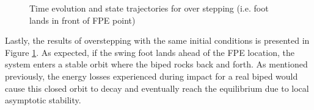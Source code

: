 \begin{figure}[!h]
	\begin{center}
	\end{center}
  	\caption{Time evolution and state trajectories for over stepping (i.e. foot lands in front of FPE point)}
	\label{sim:over}
\end{figure}

Lastly, the results of overstepping with the same initial conditions is presented in Figure \ref{sim:over}. As expected, if the swing foot lands ahead of the FPE location, the system enters a stable orbit where the biped rocks back and forth. As mentioned previously, the energy losses experienced during impact for a real biped would cause this closed orbit to decay and eventually reach the equilibrium due to local asymptotic stability. 

